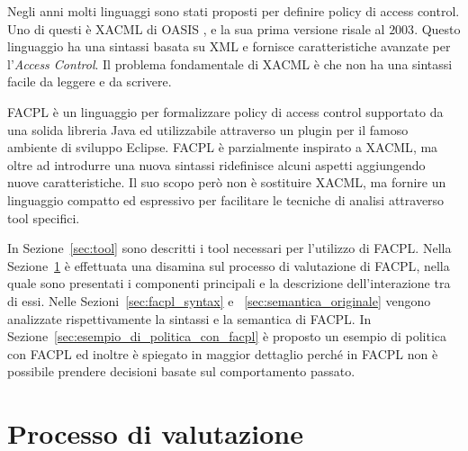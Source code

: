 \label{cap:facpl}
Negli anni molti linguaggi sono stati proposti per definire policy di access control. Uno di questi è \acf{XACML} di OASIS \cite{XACML}, e la sua prima versione risale al $2003$. Questo linguaggio ha una sintassi basata su \ac{XML} e fornisce caratteristiche avanzate per l'\textit{Access Control}. Il problema fondamentale di \ac{XACML} è che non ha una sintassi facile da leggere e da scrivere. \par
\acf{FACPL} \cite{fullfacpl} è un linguaggio per formalizzare policy di access control supportato da una solida libreria Java ed utilizzabile attraverso un plugin per il famoso ambiente di sviluppo Eclipse.
\ac{FACPL} è parzialmente inspirato a \ac{XACML}, ma oltre ad introdurre una nuova sintassi ridefinisce alcuni aspetti aggiungendo nuove caratteristiche. Il suo scopo però non è sostituire \ac{XACML}, ma fornire un linguaggio compatto ed espressivo per facilitare le tecniche di analisi attraverso tool specifici.\par
In Sezione~\ref{sec:tool} sono descritti i tool necessari per l'utilizzo di 
\ac{FACPL}.
Nella Sezione~\ref{sec:valutazione_facpl} è effettuata una disamina sul processo di valutazione di \ac{FACPL}, nella quale sono presentati i componenti principali e la descrizione dell'interazione tra di essi.
Nelle Sezioni~\ref{sec:facpl_syntax} e ~\ref{sec:semantica_originale} vengono analizzate rispettivamente la sintassi e la semantica di \ac{FACPL}.
In Sezione~\ref{sec:esempio_di_politica_con_facpl} è proposto un esempio di politica con \ac{FACPL} ed inoltre è spiegato in maggior dettaglio perché in \ac{FACPL} non è possibile prendere decisioni basate sul comportamento passato.





\section{Processo di valutazione}
\label{sec:valutazione_facpl}



